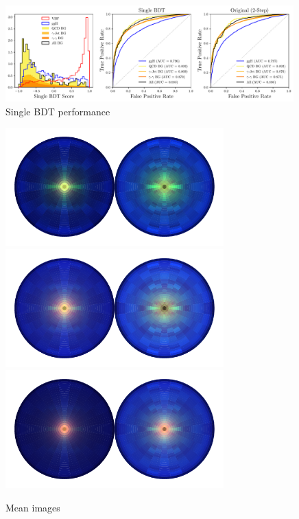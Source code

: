 %
\begin{figure}[h!]
    \begin{center}
    \includegraphics[width=0.99\textwidth]{figures/appendix_VBFLPS/dijet_BDT_LPS_unw.pdf}
    \end{center}
    \caption{Single BDT performance}
    \label{fig:vbf_lps_appendix:single_BDT}
\end{figure}
%
\begin{figure}[h!]
    \begin{center}
    \includegraphics[width=0.75\textwidth]{figures/appendix_VBFLPS/mean_vbf_LPS_uw.pdf}
    \includegraphics[width=0.75\textwidth]{figures/appendix_VBFLPS/mean_ggh_LPS_uw.pdf}
    \includegraphics[width=0.75\textwidth]{figures/appendix_VBFLPS/mean_bkg_LPS_uw.pdf}
    \end{center}
    \caption{Mean images}
    \label{fig:vbf_lps_appendix:mean_jet_image}
\end{figure}
